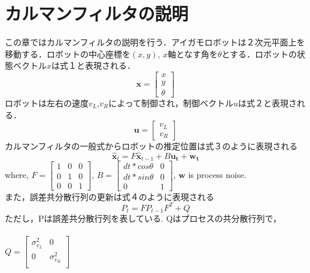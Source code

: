 \documentclass[a4paper]{article}
\begin{document}
\section{カルマンフィルタの説明}
この章ではカルマンフィルタの説明を行う．アイガモロボットは２次元平面上を移動する．ロボットの中心座標を$(x,y)$, $x$軸となす角を$\theta$とする．ロボットの状態ベクトル$x$は式１と表現される．
\begin{equation}
    \bm{x} = \begin{bmatrix}
        x \\
        y \\
        \theta
        \end{bmatrix} 
\end{equation}
ロボットは左右の速度$v_{L}$,$v_{R}$によって制御され，制御ベクトル$u$は式２と表現される．
\begin{equation}
    \bm{u} = \begin{bmatrix}
        v_{L} \\
        v_{R} 
        \end{bmatrix} 
\end{equation}
%
%
カルマンフィルタの一般式からロボットの推定位置は式３のように表現される
\begin{equation}
    \bm{\hat{x}}_{t} =F\bm{\hat{x}}_{t-1} + B\bm{u_{t}} + \bm{w_{t}}
\end{equation}
where, $F = \begin{bmatrix} 1 & 0 & 0 \\  0 & 1 & 0 \\  0 & 0 & 1 \end{bmatrix}$,
$B = \begin{bmatrix} dt * cos\theta & 0 \\  dt * sin\theta & 0 \\ 0 & 1 \end{bmatrix}$, 
$\bm{w}$ is process noise.\\
%
%
また，誤差共分散行列の更新は式４のように表現される
\begin{equation}
    P_{t} = F P_{t-1} F^{T} + Q
    \label{eq:4}
\end{equation}
ただし，Pは誤差共分散行列を表している. Qはプロセスの共分散行列で，\\ \\$Q = \begin{bmatrix} \sigma_{v_{L}}^{2} & 0 \\  0 & \sigma_{v_{R}}^{2} \\  \end{bmatrix}$\\ \\
\end{document}
